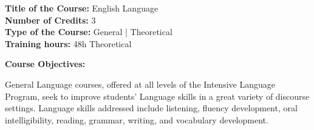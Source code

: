 \documentclass[12pt,a4paper]{article}
\begin{document}
\par\vspace{14pt}
\nopagebreak
\textbf{Title of the Course:} English Language\\
\textbf{Number of Credits:} 3\\
\textbf{Type of the Course:} General | Theoretical\\
\textbf{Training hours:} 48h Theoretical\par\vspace{4pt}
\textbf{Course Objectives:}\par\vspace{2pt}
General Language courses, offered at all levels of the Intensive Language Program, seek to
improve students' Language skills in a great variety of discourse settings. Language skills
addressed include listening, fluency development, oral intelligibility, reading, grammar, writing,
and vocabulary development.\par\vspace{4pt}
\end{document}

